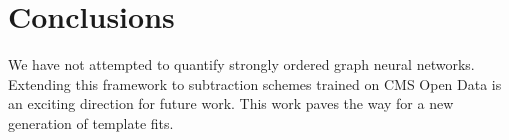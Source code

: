 \section{Conclusions}\label{sec:conclusions}

We have not attempted to quantify strongly ordered graph neural
networks. Extending this framework to subtraction schemes trained on CMS
Open Data is an exciting direction for future work. This work paves the
way for a new generation of template fits.


